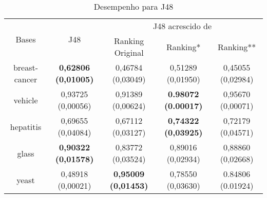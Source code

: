 \begin{table}[h]
    \begin{tabular}{ c c c c c }
        \hline
    
        \multirow{2}{*}{Bases} & \multirow{2}{*}{J48} & \multicolumn{3}{c}{J48 acrescido de} \\ \cline{3-5}
        & & {\small Ranking Original} & {\small Ranking*} & {\small  Ranking**} \\

        \hline
        
        breast-cancer & {\small \textbf{0,62806 (0,01005)}} & {\small 0,46784 (0,03049)} & {\small 0,51289 (0,01950)} & {\small 0,45055 (0,02984)} \\
        vehicle & {\small 0,93725 (0,00056)} & {\small 0,91389 (0,00624)} & {\small \textbf{0.98072 (0.00017)}} & {\small 0,95670 (0,00071)} \\
        hepatitis & {\small 0,69655 (0,04084)} & {\small 0,67112 (0,03127)} & {\small \textbf{0,74322 (0,03925)}} & {\small 0,72179 (0,04571)} \\
        glass & {\small \textbf{0,90322 (0,01578)}} & {\small 0,83772 (0,03524)} & {\small 0,89016 (0,02934)} & {\small 0,88860 (0,02668)} \\
        yeast & {\small 0,48918 (0,00021)} & {\small \textbf{0,95009 (0,01453)}} & {\small 0,78550 (0,03630)} & {\small 0.84806 (0.01924)} \\
    
        \hline
    \end{tabular}
    
    \caption{Desempenho para J48}
    \label{j48_results_table}
\end{table}

